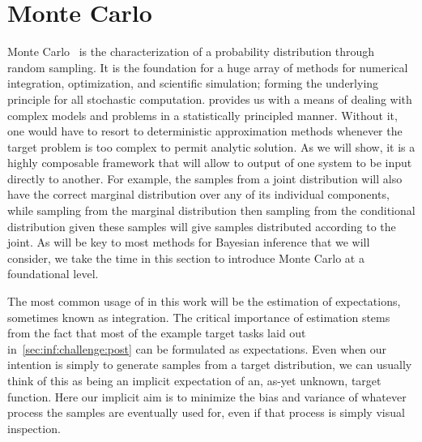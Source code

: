 
\section{Monte Carlo}
\label{sec:inf:mc}

Monte Carlo~\citep{metropolis1949monte} is the characterization of a probability distribution 
through random sampling. It is the foundation for a huge array of methods for numerical 
integration, optimization, and scientific simulation; forming the underlying principle 
for all stochastic computation.
\mc provides us with a means of dealing with complex models and problems in a
statistically principled manner.  Without it, one would have to resort to deterministic
approximation methods whenever the target problem is too complex to permit analytic
solution.  As we will show, it is a highly composable framework that will allow to output
of one system to be input directly to another.  For example, the \mc samples from a joint
distribution will also have the correct marginal distribution over any of its individual components,
while sampling from the marginal distribution then sampling from the conditional distribution
given these samples will give samples distributed according to the joint.  As \mc
will be key to most methods for Bayesian inference that we will consider, we take the time
in this section to introduce Monte Carlo at a foundational level.

The most common usage of \mc in this work will be the \mc estimation of expectations, 
sometimes known as \mc integration.  
The critical importance of \mc estimation stems from the fact that most of the example
target tasks laid out in~\ref{sec:inf:challenge:post} can be formulated as expectations.
Even when our intention is simply to generate samples from a target distribution, we can
usually think of this as being an implicit expectation of an, as-yet unknown, target function.
Here our implicit aim is to minimize the bias and variance of whatever process the samples are eventually
used for, even if that process is simply visual inspection.  

